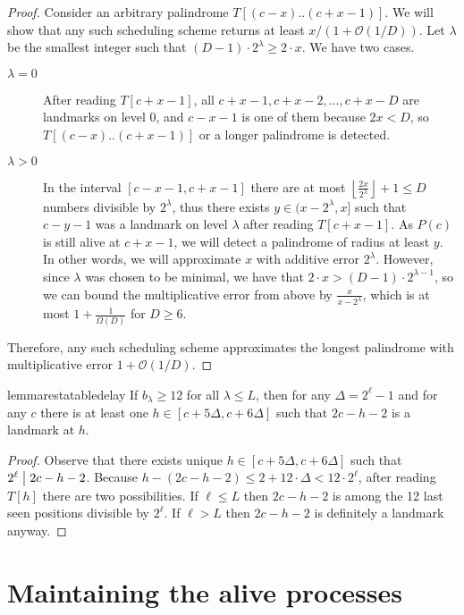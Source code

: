 \documentclass{article}[11pt,letter]
\newcommand{\bigo}{\mathcal{O}}
\newcommand{\head}{h}
\newcommand{\divides}{\bigm|}
\newcommand{\level}{\lambda}
\begin{document}
\begin{proof}
Consider an arbitrary palindrome $T[(c-x)..(c+x-1)]$. We will show that any such scheduling scheme returns at least $x/(1+\bigo(1/D))$.
Let $\level$ be the smallest integer such that $(D-1) \cdot 2^\level \ge 2 \cdot x$. We have two cases.

\begin{description}
\item[$\level=0$] After reading $T[c+x-1]$, all $c+x-1,c+x-2,\ldots,c+x-D$ are landmarks on level 0, and $c-x-1$ is one
of them because $2x < D$, so $T[(c-x)..(c+x-1)]$ or a longer palindrome is detected.

\item[$\level>0$] In the interval $[c-x-1,c+x-1]$ there are at most $\left\lfloor \frac{2x}{2^\level} \right\rfloor +1 \le D$  numbers divisible by $2^{\level}$,
thus there exists $y \in (x-2^{\level},x]$ such that $c-y-1$ was a landmark on level $\level$ after reading $T[c+x-1]$. As $P(c)$ is still alive
at $c+x-1$, we will detect a palindrome of radius at least $y$. In other words, we will approximate $x$ with additive error $2^{\level}$.
However, since $\level$ was chosen to be minimal, we have that $2 \cdot x > (D-1) \cdot 2^{\level-1}$, so we can bound the multiplicative error from above by
$\frac{x}{x-2^{\level}}$, which is at most $1+\frac{1}{\Omega(D)}$ for $D\geq 6$.
\end{description}
Therefore, any such scheduling scheme approximates the longest palindrome with multiplicative error $1+\bigo(1/D)$.
\end{proof}

\begin{restatable}{lemma}{restatabledelay}
\label{lemma:delay}
If $b_{\level}\geq 12$ for all $\level\leq L$, then for any $\Delta = 2^{\ell}-1$ and for any $c$ there is at least one $h \in [c+5\Delta,c+6\Delta]$ such that 
$2c-\head-2$ is a landmark at $\head$.
\end{restatable}

\begin{proof}
Observe that there exists unique $h \in [c+5\Delta,c+6\Delta]$ such that $2^{\ell} \divides 2c-h-2$. Because $h - (2c-h-2) \le 2+12\cdot \Delta < 12\cdot2^{\ell}$, after reading $T[\head]$ there are two possibilities. If $\ell \le L$ then $2c-h-2$ is among the 12 last seen positions divisible by $2^\ell$. If $\ell>L$ then $2c-h-2$ is definitely a landmark anyway.
\end{proof}

\section{Maintaining the alive processes}
\label{section:time}
\end{document}
